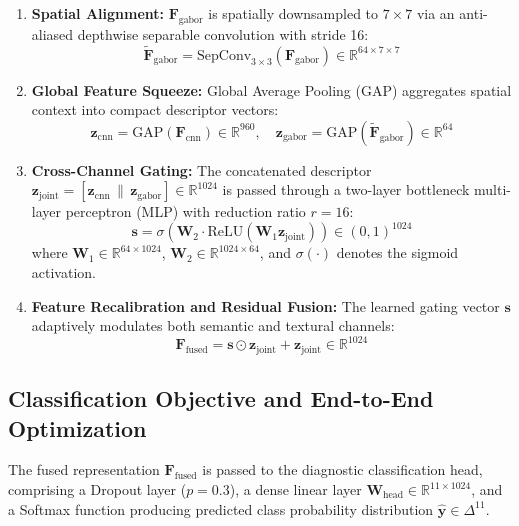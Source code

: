 \begin{enumerate}
    \item \textbf{Spatial Alignment:} $\mathbf{F}_{\text{gabor}}$ is spatially downsampled to $7 \times 7$ via an anti-aliased depthwise separable convolution with stride 16:
    \begin{equation}
        \tilde{\mathbf{F}}_{\text{gabor}} = \text{SepConv}_{3 \times 3}(\mathbf{F}_{\text{gabor}}) \in \mathbb{R}^{64 \times 7 \times 7}
    \end{equation}
    \item \textbf{Global Feature Squeeze:} Global Average Pooling (GAP) aggregates spatial context into compact descriptor vectors:
    \begin{equation}
        \mathbf{z}_{\text{cnn}} = \text{GAP}(\mathbf{F}_{\text{cnn}}) \in \mathbb{R}^{960}, \quad \mathbf{z}_{\text{gabor}} = \text{GAP}(\tilde{\mathbf{F}}_{\text{gabor}}) \in \mathbb{R}^{64}
    \end{equation}
    \item \textbf{Cross-Channel Gating:} The concatenated descriptor $\mathbf{z}_{\text{joint}} = [\mathbf{z}_{\text{cnn}} \,\|\, \mathbf{z}_{\text{gabor}}] \in \mathbb{R}^{1024}$ is passed through a two-layer bottleneck multi-layer perceptron (MLP) with reduction ratio $r = 16$:
    \begin{equation}
        \mathbf{s} = \sigma\left( \mathbf{W}_2 \cdot \text{ReLU}\left( \mathbf{W}_1 \mathbf{z}_{\text{joint}} \right) \right) \in (0, 1)^{1024}
    \end{equation}
    where $\mathbf{W}_1 \in \mathbb{R}^{64 \times 1024}$, $\mathbf{W}_2 \in \mathbb{R}^{1024 \times 64}$, and $\sigma(\cdot)$ denotes the sigmoid activation.
    \item \textbf{Feature Recalibration and Residual Fusion:} The learned gating vector $\mathbf{s}$ adaptively modulates both semantic and textural channels:
    \begin{equation}
        \mathbf{F}_{\text{fused}} = \mathbf{s} \odot \mathbf{z}_{\text{joint}} + \mathbf{z}_{\text{joint}} \in \mathbb{R}^{1024}
    \end{equation}
\end{enumerate}

\subsection{Classification Objective and End-to-End Optimization}
The fused representation $\mathbf{F}_{\text{fused}}$ is passed to the diagnostic classification head, comprising a Dropout layer ($p = 0.3$), a dense linear layer $\mathbf{W}_{\text{head}} \in \mathbb{R}^{11 \times 1024}$, and a Softmax function producing predicted class probability distribution $\hat{\mathbf{y}} \in \Delta^{11}$.

